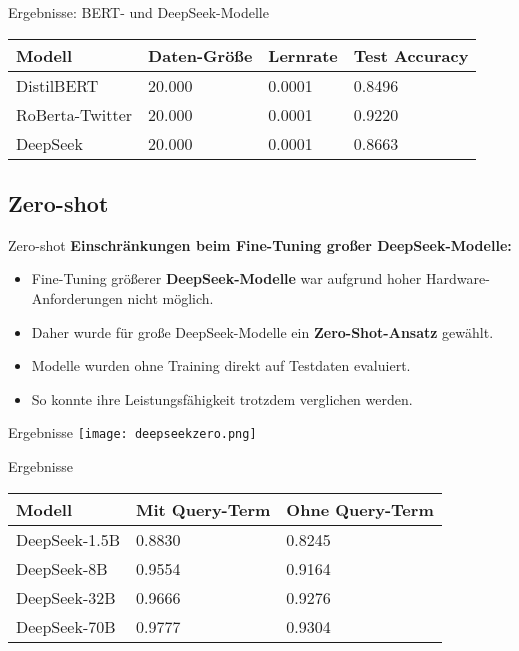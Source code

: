 \documentclass[aspectratio=169]{beamer} %
\begin{document}
\begin{frame}{Ergebnisse: BERT- und DeepSeek-Modelle}
    \centering
    \scriptsize
    \begin{tabular}{|l|l|l|l|}
        \hline
        \textbf{Modell} & \textbf{Daten-Größe} & \textbf{Lernrate} & \textbf{Test Accuracy} \\
        \hline
        DistilBERT & 20.000 & 0.0001 & 0.8496 \\
        RoBerta-Twitter & 20.000 & 0.0001 & 0.9220 \\
        DeepSeek & 20.000 & 0.0001 & 0.8663 \\
        \hline
    \end{tabular}
\end{frame}

\subsection{Zero-shot}
\begin{frame}{Zero-shot}
  \Large
  \textbf{Einschränkungen beim Fine-Tuning großer DeepSeek-Modelle:}

  \vspace{0.5cm}

  \begin{itemize}
      \item Fine-Tuning größerer \textbf{DeepSeek-Modelle} war aufgrund hoher Hardware-Anforderungen nicht möglich.
      \item Daher wurde für große DeepSeek-Modelle ein \textbf{Zero-Shot-Ansatz} gewählt.
      \item Modelle wurden ohne Training direkt auf Testdaten evaluiert.
      \item So konnte ihre Leistungsfähigkeit trotzdem verglichen werden.
  \end{itemize}

\end{frame}

\begin{frame}{Ergebnisse}
    \centering
    \texttt{[image: deepseekzero.png]}
\end{frame}

\begin{frame}{Ergebnisse}
    \centering
    \scriptsize
    \begin{tabular}{|l|l|l|}
        \hline
        \textbf{Modell} & \textbf{Mit Query-Term} & \textbf{Ohne Query-Term} \\
        \hline
        DeepSeek-1.5B & 0.8830 & 0.8245 \\
        DeepSeek-8B   & 0.9554 & 0.9164 \\
        DeepSeek-32B  & 0.9666 & 0.9276 \\
        DeepSeek-70B  & 0.9777 & 0.9304 \\
        \hline
    \end{tabular}
\end{frame}
\end{document}
